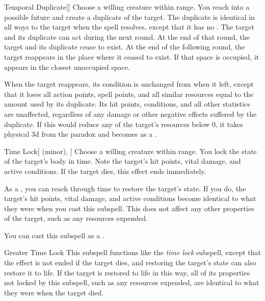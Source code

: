 \begin{ability}[\nth{5}]{Temporal Duplicate}[]
Choose a willing creature within \rngmed range.
You reach into a possible future and create a duplicate of the target.
The duplicate is identical in all ways to the target when the spell resolves, except that it has no .
The target and its duplicate can act during the next round.
At the end of that round, the target and its duplicate cease to exist.
At the end of the following round, the target reappears in the place where it ceased to exist.
If that space is occupied, it appears in the closest unoccupied space.

When the target reappears, its condition is unchanged from when it left, except that it loses all action points, spell points, and all similar resources equal to the amount used by its duplicate.
Its hit points, conditions, and all other statistics are unaffected, regardless of any damage or other negative effects suffered by the duplicate.
If this would reduce any of the target's resources below 0, it takes physical  \plus3d from the paradox and becomes  as a .
\end{ability}
\vspace{0.25em}


\begin{ability}[\nth{6}]{Time Lock}[ (minor), ]
Choose a willing creature within \rngmed range.
You lock the state of the target's body in time.
Note the target's hit points, vital damage, and active conditions.
If the target dies, this effect ends immediately.

As a , you can reach through time to restore the target's state.
If you do, the target's hit points, vital damage, and active conditions become identical to what they were when you cast this subspell.
This does not affect any other properties of the target, such as any resources expended.

You can cast this subspell as a .
\end{ability}
\vspace{0.25em}


\begin{ability}[\nth{9}]{Greater Time Lock}
This subspell functions like the \textit{time lock} subspell, except that the effect is not ended if the target dies, and restoring the target's state can also restore it to life.
If the target is restored to life in this way, all of its properties not locked by this subspell, such as any resources expended, are identical to what they were when the target died.
\end{ability}
\vspace{0.25em}



